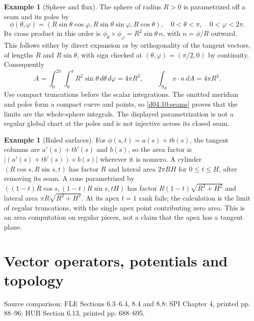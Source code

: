 \documentclass[11pt,oneside,openany]{book}
\theoremstyle{definition}
\newtheorem{example}[theorem]{Example}
\theoremstyle{remark}
\newcommand{\source}[1]{\par\begingroup\small\sffamily\color{black!65}Source comparison: #1\par\endgroup}
\begin{document}
\begin{example}[Sphere and flux]\label{d04:10:sphere}
The sphere of radius $R>0$ is parametrized off a seam and its poles by
\[
 \phi(\theta,\varphi)
 =(R\sin\theta\cos\varphi,R\sin\theta\sin\varphi,R\cos\theta),
 \quad 0<\theta<\pi,\quad0<\varphi<2\pi.
\]
Its cross product in this order is
$\phi_\theta\times\phi_\varphi=R^2\sin\theta\,n$, with $n=\phi/R$
outward. This follows either by direct expansion or by orthogonality of
the tangent vectors, of lengths $R$ and $R\sin\theta$, with sign checked
at $(\theta,\varphi)=(\pi/2,0)$ by continuity. Consequently
\[
 A=\int_0^{2\pi}\int_0^\pi R^2\sin\theta\,d\theta\,d\varphi=4\pi R^2,
 \qquad\int_{S_R} x\cdot n\,dA=4\pi R^3.
\]
Use compact truncations before the scalar integrations. The omitted
meridian and poles form a compact curve and points, so
\cref{d04:10:seams} proves that the limits are the whole-sphere integrals.
The displayed parametrization is not a regular global chart at the poles
and is not injective across its closed seam.
\end{example}

\begin{example}[Ruled surfaces]\label{d04:10:ruled}
For $\phi(s,t)=a(s)+t b(s)$, the tangent columns are $a'(s)+t b'(s)$ and
$b(s)$, so the area factor is
$|(a'(s)+t b'(s))\times b(s)|$ wherever it is nonzero. A cylinder
$(R\cos s,R\sin s,t)$ has factor $R$ and lateral area $2\pi RH$ for
$0\le t\le H$, after removing its seam. A cone parametrized by
$((1-t)R\cos s,(1-t)R\sin s,tH)$ has factor
$R(1-t)\sqrt{R^2+H^2}$ and lateral area $\pi R\sqrt{R^2+H^2}$.
At its apex $t=1$ rank fails; the calculation is the limit of regular
truncations, with the single apex point contributing zero area. This is an
area computation on regular pieces, not a claim that the apex has a tangent plane.
\end{example}



\chapter{Vector operators, potentials and topology}
\label{ch:d04-11}
\source{FLE Sections 6.3--6.4, 8.4 and 8.8; SPI Chapter 4, printed pp. 88--96; HUB Section 6.13, printed pp. 688--695.}
\end{document}
